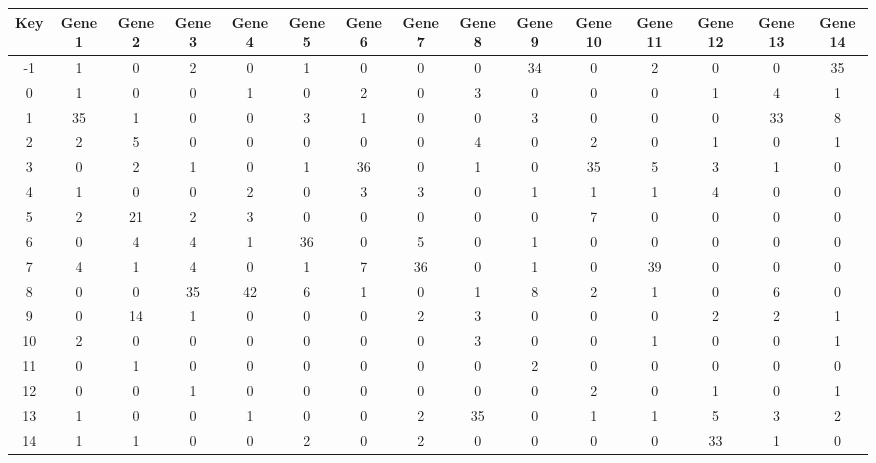 \begin{tabular}{|c|c|c|c|c|c|c|c|c|c|c|c|c|c|c|}
\hline
Key & Gene 1 & Gene 2 & Gene 3 & Gene 4 & Gene 5 & Gene 6 & Gene 7 & Gene 8 & Gene 9 & Gene 10 & Gene 11 & Gene 12 & Gene 13 & Gene 14 \\
\hline
-1 & 1 & 0 & 2 & 0 & 1 & 0 & 0 & 0 & 34 & 0 & 2 & 0 & 0 & 35 \\
0 & 1 & 0 & 0 & 1 & 0 & 2 & 0 & 3 & 0 & 0 & 0 & 1 & 4 & 1 \\
1 & 35 & 1 & 0 & 0 & 3 & 1 & 0 & 0 & 3 & 0 & 0 & 0 & 33 & 8 \\
2 & 2 & 5 & 0 & 0 & 0 & 0 & 0 & 4 & 0 & 2 & 0 & 1 & 0 & 1 \\
3 & 0 & 2 & 1 & 0 & 1 & 36 & 0 & 1 & 0 & 35 & 5 & 3 & 1 & 0 \\
4 & 1 & 0 & 0 & 2 & 0 & 3 & 3 & 0 & 1 & 1 & 1 & 4 & 0 & 0 \\
5 & 2 & 21 & 2 & 3 & 0 & 0 & 0 & 0 & 0 & 7 & 0 & 0 & 0 & 0 \\
6 & 0 & 4 & 4 & 1 & 36 & 0 & 5 & 0 & 1 & 0 & 0 & 0 & 0 & 0 \\
7 & 4 & 1 & 4 & 0 & 1 & 7 & 36 & 0 & 1 & 0 & 39 & 0 & 0 & 0 \\
8 & 0 & 0 & 35 & 42 & 6 & 1 & 0 & 1 & 8 & 2 & 1 & 0 & 6 & 0 \\
9 & 0 & 14 & 1 & 0 & 0 & 0 & 2 & 3 & 0 & 0 & 0 & 2 & 2 & 1 \\
10 & 2 & 0 & 0 & 0 & 0 & 0 & 0 & 3 & 0 & 0 & 1 & 0 & 0 & 1 \\
11 & 0 & 1 & 0 & 0 & 0 & 0 & 0 & 0 & 2 & 0 & 0 & 0 & 0 & 0 \\
12 & 0 & 0 & 1 & 0 & 0 & 0 & 0 & 0 & 0 & 2 & 0 & 1 & 0 & 1 \\
13 & 1 & 0 & 0 & 1 & 0 & 0 & 2 & 35 & 0 & 1 & 1 & 5 & 3 & 2 \\
14 & 1 & 1 & 0 & 0 & 2 & 0 & 2 & 0 & 0 & 0 & 0 & 33 & 1 & 0 \\
\hline
\end{tabular}
